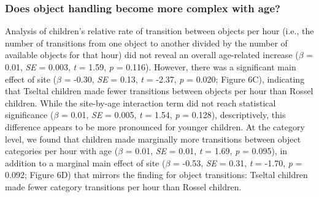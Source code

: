 \documentclass[10pt, letterpaper]{article}
\begin{document}
\hypertarget{does-object-handling-become-more-complex-with-age}{%
\subsubsection{Does object handling become more complex with
age?}\label{does-object-handling-become-more-complex-with-age}}

Analysis of children's relative rate of transition between objects per
hour (i.e., the number of transitions from one object to another divided
by the number of available objects for that hour) did not reveal an
overall age-related increase (\(\beta\) = 0.01, \emph{SE} = 0.003,
\emph{t} = 1.59, \emph{p} = 0.116). However, there was a significant
main effect of site (\(\beta\) = -0.30, \emph{SE} = 0.13, \emph{t} =
-2.37, \emph{p} = 0.020; Figure 6C), indicating that Tseltal children
made fewer transitions between objects per hour than Rossel children.
While the site-by-age interaction term did not reach statistical
significance (\(\beta\) = 0.01, \emph{SE} = 0.005, \emph{t} = 1.54,
\emph{p} = 0.128), descriptively, this difference appears to be more
pronounced for younger children. At the category level, we found that
children made marginally more transitions between object categories per
hour with age (\(\beta\) = 0.01, \emph{SE} = 0.01, \emph{t} = 1.69,
\emph{p} = 0.095), in addition to a marginal main effect of site
(\(\beta\) = -0.53, \emph{SE} = 0.31, \emph{t} = -1.70, \emph{p} =
0.092; Figure 6D) that mirrors the finding for object transitions:
Tseltal children made fewer category transitions per hour than Rossel
children.
\end{document}
